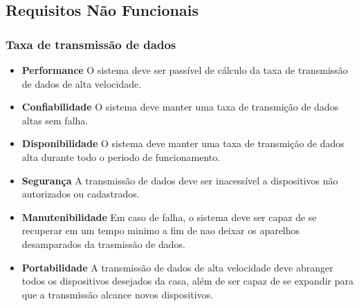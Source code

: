 \subsection{Requisitos Não Funcionais}

\subsubsection{Taxa de transmissão de dados}

\begin{itemize}

	\item \textbf{Performance}
	O sistema deve ser passível de cálculo da taxa de transmissão de dados de alta velocidade.

	\item \textbf{Confiabilidade}
	O sistema deve manter uma taxa de transmição de dados altas sem falha.

	\item \textbf{Disponibilidade}
	O sistema deve manter uma taxa de transmição de dados alta durante todo o periodo de funcionamento.

	\item \textbf{Segurança}
	A transmissão de dados deve ser inacessível a dispositivos não autorizados ou cadastrados.

	\item \textbf{Manutenibilidade}
	Em caso de falha, o sistema deve ser capaz de se recuperar em um tempo minimo a fim de nao deixar os aparelhos
	desamparados da trasmissão de dados.

	\item \textbf{Portabilidade}
	A transmissão de dados de alta velocidade deve abranger todos os dispositivos desejados da casa, além de ser
	capaz de se expandir para que a transmissão alcance novos dispositivos.

\end{itemize}

